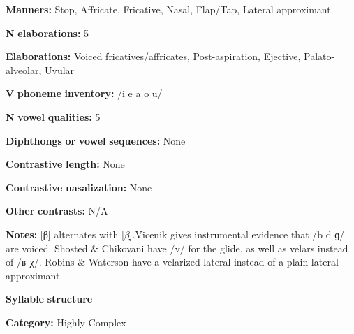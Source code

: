\begin{styleBody}
\textbf{Manners:} Stop, Affricate, Fricative, Nasal, Flap/Tap, Lateral approximant
\end{styleBody}

\begin{styleBody}
\textbf{N} \textbf{elaborations:} 5
\end{styleBody}

\begin{styleBody}
\textbf{Elaborations:} Voiced fricatives/affricates, Post-aspiration, Ejective, Palato-alveolar, Uvular
\end{styleBody}

\begin{styleBody}
\textbf{V} \textbf{phoneme} \textbf{inventory:} /i e a o u/
\end{styleBody}

\begin{styleBody}
\textbf{N} \textbf{vowel} \textbf{qualities:} 5
\end{styleBody}

\begin{styleBody}
\textbf{Diphthongs} \textbf{or} \textbf{vowel} \textbf{sequences:} None
\end{styleBody}

\begin{styleBody}
\textbf{Contrastive} \textbf{length:} None
\end{styleBody}

\begin{styleBody}
\textbf{Contrastive} \textbf{nasalization:} None
\end{styleBody}

\begin{styleBody}
\textbf{Other} \textbf{contrasts:} N/A
\end{styleBody}

\begin{styleBody}
\textbf{Notes:} [β] alternates with [$\beta ̞$].Vicenik gives instrumental evidence that /b d ɡ/ are voiced. Shosted \& Chikovani have /v/ for the glide, as well as velars instead of /ʁ χ/. Robins \& Waterson have a velarized lateral instead of a plain lateral approximant.
\end{styleBody}

\begin{styleBody}
\textbf{Syllable} \textbf{structure}
\end{styleBody}

\begin{styleBody}
\textbf{Category:} Highly Complex
\end{styleBody}

